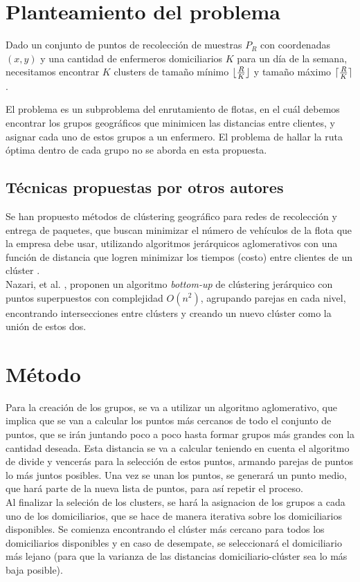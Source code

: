 \documentclass[runningheads]{llncs}
\DeclarePairedDelimiter{\ceil}{\lceil}{\rceil}
\DeclarePairedDelimiter{\floor}{\lfloor}{\rfloor}
\begin{document}
\section{Planteamiento del problema}
Dado un conjunto de puntos de recolección de muestras $P_{R}$ con coordenadas
$(x, y)$ y una cantidad de enfermeros domiciliarios $K$ para un día de la semana,
necesitamos encontrar $K$ clusters de tamaño mínimo $\floor{\frac{R}{K}}$ y tamaño
máximo $\ceil{\frac{R}{K}}$.

El problema es un subproblema del enrutamiento de flotas, en el cuál debemos encontrar
los grupos geográficos que minimicen las distancias entre clientes, y asignar cada uno
de estos grupos a un enfermero. El problema de hallar la ruta óptima dentro de cada
grupo no se aborda en esta propuesta.
\subsection{Técnicas propuestas por otros autores}
Se han propuesto métodos de clústering geográfico para redes de recolección y entrega
de paquetes, que buscan minimizar el número de vehículos de la flota que
la empresa debe usar, utilizando algoritmos jerárquicos aglomerativos con una función
de distancia que logren minimizar los tiempos (costo) entre clientes de un clúster
\cite{bard11}.
\\
Nazari, et al. \cite{nazari19}, proponen un algoritmo \textit{bottom-up} de clústering
jerárquico con puntos superpuestos con complejidad $O(n^{2})$, agrupando parejas en cada nivel,
encontrando intersecciones entre clústers y creando un nuevo clúster como la unión de estos dos.
\section{Método}
Para la creación de los grupos, se va a utilizar un algoritmo aglomerativo, que implica que se
van a calcular los puntos más cercanos de todo el conjunto de puntos, que se irán juntando poco
a poco hasta formar grupos más grandes con la cantidad deseada. Esta distancia se va a calcular
teniendo en cuenta el algoritmo de divide y vencerás para la selección de estos puntos, armando
parejas de puntos lo más juntos posibles. Una vez se unan los puntos, se generará un punto medio,
que hará parte de la nueva lista de puntos, para así repetir el proceso.
\\
Al finalizar la seleción de los clusters, se hará la asignacion de los grupos a cada
uno de los domiciliarios, que se hace de manera iterativa sobre los domiciliarios disponibles.
Se comienza encontrando el clúster más cercano para todos los domiciliarios disponibles y en
caso de desempate, se seleccionará el domiciliario más lejano (para que la varianza de las
distancias domiciliario-clúster sea lo más baja posible).
\end{document}
